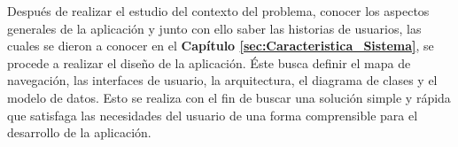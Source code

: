 Después de realizar el estudio del contexto del problema, conocer los aspectos generales de la aplicación y junto con ello saber las historias de usuarios, las cuales se dieron a conocer en el \textbf{Capítulo \ref{sec:Caracteristica_Sistema}}, se procede a realizar el diseño de la aplicación. Éste busca definir el mapa de navegación, las interfaces de usuario, la arquitectura, el diagrama de clases y el modelo de datos. Esto se realiza con el fin de buscar una solución simple y rápida que satisfaga las necesidades del usuario de una forma comprensible para el desarrollo de la aplicación.